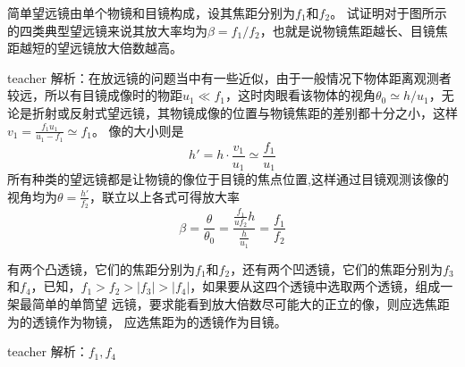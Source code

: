 \begin{example}
简单望远镜由单个物镜和目镜构成，设其焦距分别为$f_1$和$f_2$。
试证明对于图所示的四类典型望远镜来说其放大率均为$\beta=f_1/f_2$，也就是说物镜焦距越长、目镜焦距越短的望远镜放大倍数越高。
\begin{taggedblock}{teacher}
\newline
解析：在放远镜的问题当中有一些近似，由于一般情况下物体距离观测者较远，所以有目镜成像时的物距$u_1\ll f_1$，这时肉眼看该物体的视角$\theta_0\simeq h/u_1$，无论是折射或反射式望远镜，其物镜成像的位置与物镜焦距的差别都十分之小，这样$v_1=\frac{f_1u_1}{u_1-f_1}\simeq f_1$。
像的大小则是
\[
h' = h\cdot \frac{v_1}{u_1}\simeq \frac{f_1}{u_1}
\]
所有种类的望远镜都是让物镜的像位于目镜的焦点位置,这样通过目镜观测该像的视角均为$\theta = \frac{h'}{f_2}$，联立以上各式可得放大率
\[
\beta=\frac{\theta}{\theta_0}=\frac{\frac{f_1}{uf_2}h}{\frac{h}{u_1}}=\frac{f_1}{f_2}
\]
\end{taggedblock}
\end{example}


\begin{example}
有两个凸透镜，它们的焦距分别为$ f_1$和$ f_2$，还有两个凹透镜，它们的焦距分别为$ f_3$	和$ f_4$，已知，$f_1>f_2>|f_3|>|f_4|$，如果要从这四个透镜中选取两个透镜，组成一架最简单的单筒望 远镜，要求能看到放大倍数尽可能大的正立的像，则应选焦距为\kong 的透镜作为物镜， 应选焦距为\kong 的透镜作为目镜。
	\begin{taggedblock}{teacher}
		\newline
		解析：$f_1,f_4$
	\end{taggedblock}
\end{example}





